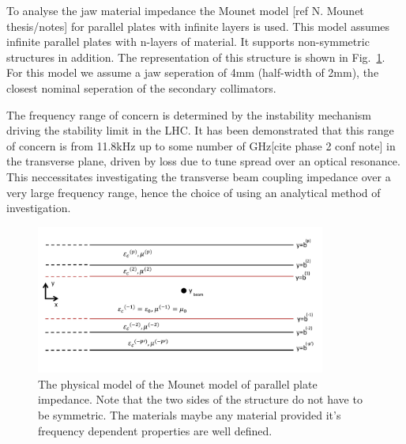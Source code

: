 To analyse the jaw material impedance the Mounet model [ref N. Mounet thesis/notes] for parallel plates with infinite layers is used. This model assumes infinite parallel plates with n-layers of material. It supports non-symmetric structures in addition. The representation of this structure is shown in Fig.~\ref{fig:mounet-model}. For this model we assume a jaw seperation of 4mm (half-width of 2mm), the closest nominal seperation of the secondary collimators.

The frequency range of concern is determined by the instability mechanism driving the stability limit in the LHC. It has been demonstrated that this range of concern is from 11.8kHz up to some number of GHz[cite phase 2 conf note] in the transverse plane, driven by loss due to tune spread over an optical resonance. This neccessitates investigating the transverse beam coupling impedance over a very large frequency range, hence the choice of using an analytical method of investigation.

\begin{figure}
\begin{center}
\includegraphics[width=0.85\textwidth]{LHC_Collimation_Upgrades/figures/mounet-model.pdf}
\end{center}
\label{fig:mounet-model}
\caption{The physical model of the Mounet model of parallel plate impedance. Note that the two sides of the structure do not have to be symmetric. The materials maybe any material provided it's frequency dependent properties are well defined.}
\end{figure}

